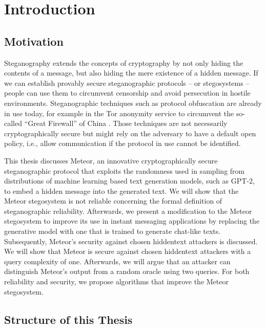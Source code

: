 \chapter{Introduction}

\section{Motivation}


Steganography extends the concepts of cryptography by not only hiding the contents of a message, but also hiding the mere existence of a hidden message.
If we can establish provably secure steganographic protocols -- or stegosystems -- people can use them to circumvent censorship and avoid persecution in hostile environments.
Steganographic techniques such as protocol obfuscation are already in use today, for example in the Tor anonymity service to circumvent the so-called ``Great Firewall'' of China \cite{TorBlocking2012}.
Those techniques are not necessarily cryptographically secure but might rely on the adversary to have a default open policy, i.e., allow communication if the protocol in use cannot be identified.

This thesis discusses Meteor, an innovative cryptographically secure steganographic protocol that exploits the randomness used in sampling from distributions of machine learning based text generation models, such as GPT-2, to embed a hidden message into the generated text.
We will show that the Meteor stegosystem is not reliable concerning the formal definition of steganographic reliability.
Afterwards, we present a modification to the Meteor stegosystem to improve its use in instant messaging applications by replacing the generative model with one that is trained to generate chat-like texts.
Subsequently, Meteor's security against chosen hiddentext attackers is discussed.
We will show that Meteor is secure against chosen hiddentext attackers with a query complexity of one.
Afterwards, we will argue that an attacker can distinguish Meteor's output from a random oracle using two queries.
For both reliability and security, we propose algorithms that improve the Meteor stegosystem.


\section{Structure of this Thesis}


